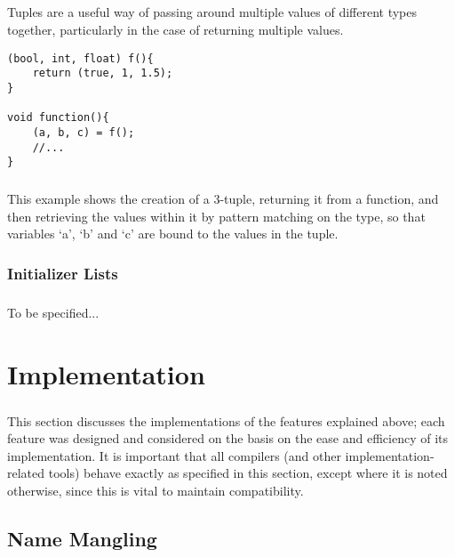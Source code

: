 \documentclass[12pt,twoside,notitlepage]{report}
\begin{document}
\paragraph{}
Tuples are a useful way of passing around multiple values of different types together, particularly in the case of returning multiple values.

\begin{lstlisting}
(bool, int, float) f(){
	return (true, 1, 1.5);
}

void function(){
	(a, b, c) = f();
	//...
}
\end{lstlisting}

\paragraph{}
This example shows the creation of a 3-tuple, returning it from a function, and then retrieving the values within it by pattern matching on the type, so that variables `a', `b' and `c' are bound to the values in the tuple.

\subsection{Initializer Lists}

\paragraph{}
To be specified...

\cleardoublepage

\chapter{Implementation}

\paragraph{}
This section discusses the implementations of the features explained above; each feature was designed and considered on the basis on the ease and efficiency of its implementation. It is important that all compilers (and other implementation-related tools) behave exactly as specified in this section, except where it is noted otherwise, since this is vital to maintain compatibility.

\section{Name Mangling}
\end{document}
